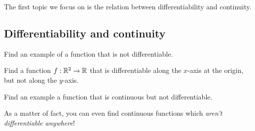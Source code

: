 The first topic we focus on is the relation between differentiability and continuity.

\subsection{Differentiability and continuity}

\begin{exr}
Find an example of a function that is not differentiable.
\end{exr}
\begin{exr}
Find a function $f:\mathbb{R} ^2\rightarrow \mathbb{R}$ that is differentiable along the $x$-axis at the origin, but not along the $y$-axis.
\end{exr}
\begin{exr}
Find an example a function that is continuous but not differentiable.
\end{exr}
As a matter of fact, you can even find continuous functions which \emph{aren't differentiable anywhere}!
